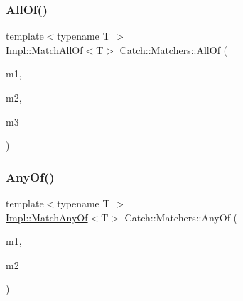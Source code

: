 \subsubsection{\texorpdfstring{All\+Of()}{AllOf()}\hspace{0.1cm}{\footnotesize\ttfamily [2/2]}}
{\footnotesize\ttfamily template$<$typename T $>$ \\
\mbox{\hyperlink{struct_catch_1_1_matchers_1_1_impl_1_1_match_all_of}{Impl\+::\+Match\+All\+Of}}$<$T$>$ Catch\+::\+Matchers\+::\+All\+Of (\begin{DoxyParamCaption}\item[{\mbox{\hyperlink{struct_catch_1_1_matchers_1_1_impl_1_1_matcher_base}{Impl\+::\+Matcher\+Base}}$<$ T $>$ const \&}]{m1,  }\item[{\mbox{\hyperlink{struct_catch_1_1_matchers_1_1_impl_1_1_matcher_base}{Impl\+::\+Matcher\+Base}}$<$ T $>$ const \&}]{m2,  }\item[{\mbox{\hyperlink{struct_catch_1_1_matchers_1_1_impl_1_1_matcher_base}{Impl\+::\+Matcher\+Base}}$<$ T $>$ const \&}]{m3 }\end{DoxyParamCaption})\hspace{0.3cm}{\ttfamily [inline]}}

\mbox{\label{namespace_catch_1_1_matchers_a07f8680aede448d54661b9ebc111ecad}} 
\subsubsection{\texorpdfstring{Any\+Of()}{AnyOf()}\hspace{0.1cm}{\footnotesize\ttfamily [1/2]}}
{\footnotesize\ttfamily template$<$typename T $>$ \\
\mbox{\hyperlink{struct_catch_1_1_matchers_1_1_impl_1_1_match_any_of}{Impl\+::\+Match\+Any\+Of}}$<$T$>$ Catch\+::\+Matchers\+::\+Any\+Of (\begin{DoxyParamCaption}\item[{\mbox{\hyperlink{struct_catch_1_1_matchers_1_1_impl_1_1_matcher_base}{Impl\+::\+Matcher\+Base}}$<$ T $>$ const \&}]{m1,  }\item[{\mbox{\hyperlink{struct_catch_1_1_matchers_1_1_impl_1_1_matcher_base}{Impl\+::\+Matcher\+Base}}$<$ T $>$ const \&}]{m2 }\end{DoxyParamCaption})\hspace{0.3cm}{\ttfamily [inline]}}

